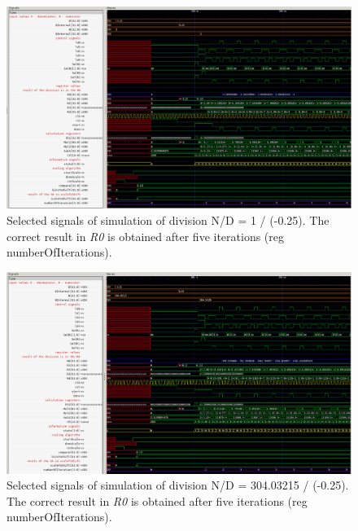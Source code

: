 \documentclass[a4paper, twoside, 11pt]{article}
\begin{document}
\begin{figure}[htbp!]
  \centering
  \includegraphics[width=1\textwidth]{src/png/division-1-div-minus-0-25.png}
    \caption{Selected signals of simulation of division N/D = 1 / (-0.25). The correct result in \textit{R0} is obtained after five iterations (reg numberOfIterations).}
  \label{fig:division-1-div-minus-0-25}
\end{figure}


\begin{figure}[htbp!]
  \centering
  \includegraphics[width=1\textwidth]{src/png/division-304-03215-div-min-0-25.png}
    \caption{Selected signals of simulation of division N/D = 304.03215 / (-0.25). The correct result in \textit{R0} is obtained after five iterations (reg numberOfIterations).}
  \label{fig:division-304-03215-div-min-0-25}
\end{figure}
\end{document}
